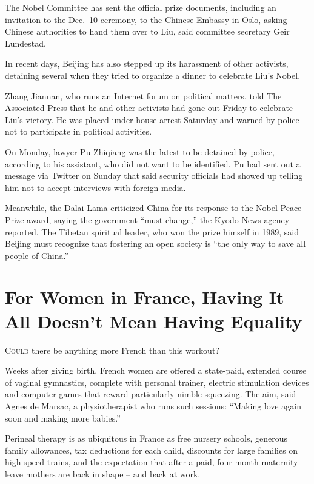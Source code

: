 ﻿\documentclass[12pt]{article}
\begin{document}
The Nobel Committee has sent the official prize documents, including an invitation to the Dec.~10
ceremony, to the Chinese Embassy in Oslo, asking Chinese authorities to hand them over to Liu, said
committee secretary Geir Lundestad.

In recent days, Beijing has also stepped up its harassment of other activists, detaining several
when they tried to organize a dinner to celebrate Liu's Nobel.

Zhang Jiannan, who runs an Internet forum on political matters, told The Associated Press that he
and other activists had gone out Friday to celebrate Liu's victory. He was placed under house arrest
Saturday and warned by police not to participate in political activities.

On Monday, lawyer Pu Zhiqiang was the latest to be detained by police, according to his assistant,
who did not want to be identified. Pu had sent out a message via Twitter on Sunday that said
security officials had showed up telling him not to accept interviews with foreign media.

Meanwhile, the Dalai Lama criticized China for its response to the Nobel Peace Prize award, saying
the government ``must change,'' the Kyodo News agency reported. The Tibetan spiritual leader, who
won the prize himself in 1989, said Beijing must recognize that fostering an open society is ``the
only way to save all people of China.''

\section{For Women in France, Having It All Doesn't Mean Having Equality}

\lettrine{C}{ould} there be anything more French than this workout?

Weeks after giving birth, French women are offered a state-paid, extended course of vaginal
gymnastics, complete with personal trainer, electric stimulation devices and computer games that
reward particularly nimble squeezing. The aim, said Agnes de Marsac, a physiotherapist who runs such
sessions: ``Making love again soon and making more babies.''

Perineal therapy is as ubiquitous in France as free nursery schools, generous family allowances, tax
deductions for each child, discounts for large families on high-speed trains, and the expectation
that after a paid, four-month maternity leave mothers are back in shape -- and back at work.
\end{document}
